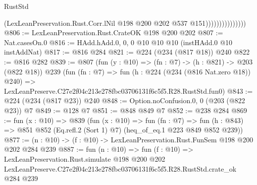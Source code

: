 \begin{lexlean}{RustStd}
\begin{coremodule}
                                (LexLeanPreservation.Rust.Corr.lNil
                                  @198
                                  @200
                                  @202
                                  @537
                                  @151)))))))))))))))
@806 := LexLeanPreservation.Rust.CrateOK @198 @200 @202
@807 := Nat.casesOn.{0}
@816 := HAdd.hAdd.{0, 0, 0} @10 @10 @10 (instHAdd.{0} @10 instAddNat)
@817 := @816 @284
@821 := @224 (@234 (@817 @18)) @240
@822 := @816 @282
@839 := @807
    (fun (y : @10) => (fn : @7) -> (h : @821) -> @203 (@822 @18))
    @239
    (fun (fn : @7) =>
    fun (h : @224 (@234 (@816 Nat.zero @18)) @240) =>
    LexLeanPreserve.C27e2f04c213e278fbc03706131f6c5f5.R28.RustStd.fun0)
@843 := @224 (@234 (@817 @23)) @240
@848 := Option.noConfusion.{0, 0} (@203 (@822 @23)) @7
@849 := @128 @7
@851 := @848 @849 @7
@852 := @238 @284
@869 := fun (x : @10) =>
  @839
    (fun (x : @10) =>
    fun (fn : @7) =>
    fun (h : @843) => @851 @852 (Eq.refl.{2} (Sort 1) @7) (heq_of_eq.{1} @223 @849 @852 @239))
@877 := (n : @10) -> (f : @10) -> LexLeanPreservation.Rust.FunSem @198 @200 @202 @284 @239
@887 := fun (n : @10) =>
  fun (f : @10) =>
  LexLeanPreservation.Rust.simulate
    @198
    @200
    @202
    LexLeanPreserve.C27e2f04c213e278fbc03706131f6c5f5.R28.RustStd.crate_ok
    @284
    @239
\end{coremodule}
\end{lexlean}
